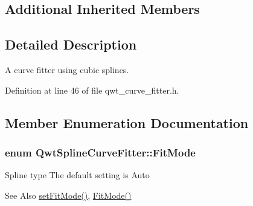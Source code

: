 \subsection*{Additional Inherited Members}


\subsection{Detailed Description}
A curve fitter using cubic splines. 

Definition at line 46 of file qwt\-\_\-curve\-\_\-fitter.\-h.



\subsection{Member Enumeration Documentation}
\hypertarget{class_qwt_spline_curve_fitter_a8c5e6858f885b5691c30092a950879a8}{
\subsubsection[{Fit\-Mode}]{\setlength{\rightskip}{0pt plus 5cm}enum {\bf Qwt\-Spline\-Curve\-Fitter\-::\-Fit\-Mode}}}\label{class_qwt_spline_curve_fitter_a8c5e6858f885b5691c30092a950879a8}
Spline type The default setting is Auto \begin{DoxySeeAlso}{See Also}
\hyperlink{class_qwt_spline_curve_fitter_a8381be57ee16b5a2bdacafbd5d71908b}{set\-Fit\-Mode()}, \hyperlink{class_qwt_spline_curve_fitter_a8c5e6858f885b5691c30092a950879a8}{Fit\-Mode()} 
\end{DoxySeeAlso}
